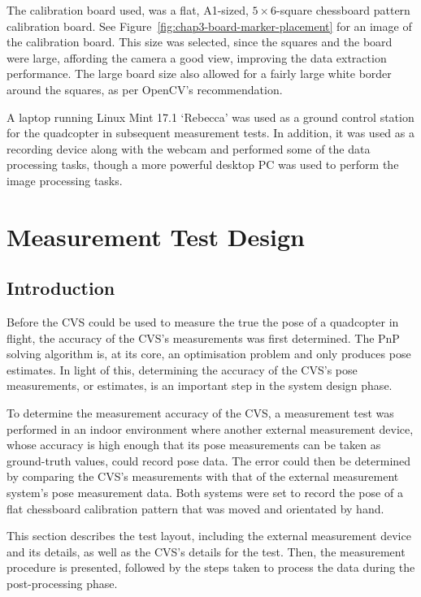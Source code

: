 The calibration board used, was a flat, A1-sized, $5\times6$-square chessboard pattern calibration board. See Figure~\ref{fig:chap3-board-marker-placement} for an image of the calibration board. This size was selected, since the squares and the board were large, affording the camera a good view, improving the data extraction performance. The large board size also allowed for a fairly large white border around the squares, as per OpenCV's recommendation. 

A laptop running Linux Mint 17.1 `Rebecca' was used as a ground control station for the quadcopter in subsequent measurement tests. In addition, it was used as a recording device along with the webcam and performed some of the data processing tasks, though a more powerful desktop PC was used to perform the image processing tasks. 

\section{Measurement Test Design}

\subsection{Introduction}

Before the CVS could be used to measure the true the pose of a quadcopter in flight, the accuracy of the CVS's measurements was first determined. The PnP solving algorithm is, at its core, an optimisation problem and only produces pose estimates. In light of this, determining the accuracy of the CVS's pose measurements, or estimates, is an important step in the system design phase. 

To determine the measurement accuracy of the CVS, a measurement test was performed in an indoor environment where another external measurement device, whose accuracy is high enough that its pose measurements can be taken as ground-truth values, could record pose data. The error could then be determined by comparing the CVS's measurements with that of the external measurement system's pose measurement data. Both systems were set to record the pose of a flat chessboard calibration pattern that was moved and orientated by hand.

This section describes the test layout, including the external measurement device and its details, as well as the CVS's details for the test. Then, the measurement procedure is presented, followed by the steps taken to process the data during the post-processing phase. 

